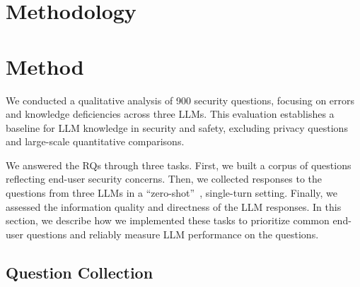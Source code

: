 


    

    


\if {}
\section{Methodology} \label{sec:method}
\fi
\if {}
\section{Method}
\label{sec:method}
\fi
We conducted a qualitative analysis of 900 security questions, focusing on errors and knowledge deficiencies across three LLMs. This evaluation establishes a baseline for LLM knowledge in security and safety, excluding privacy questions and large-scale quantitative comparisons.

We answered the RQs through three tasks. First, we built a corpus of questions reflecting end-user security concerns. Then, we collected responses to the questions from three LLMs in a ``zero-shot''~\cite{kojima2023large}, single-turn setting. Finally, we assessed the information quality and directness of the LLM responses. In this section, we describe how we implemented these tasks to prioritize common end-user questions and reliably measure LLM performance on the questions.


\subsection{Question Collection} 
\label{non-exp-question-collection} 

